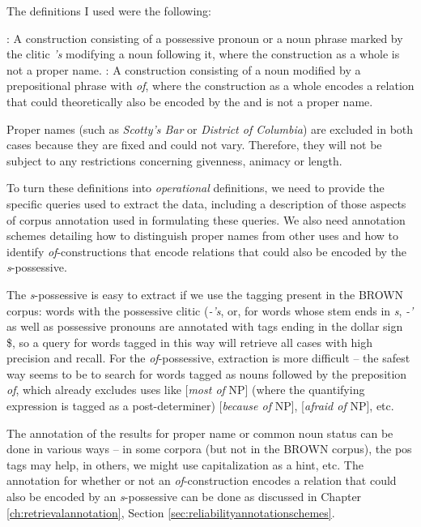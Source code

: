 The definitions I used were the following:

\begin{exe}
\ex
\begin{xlist} 
\label{ex:sgenofcdefinition}
\ex {}: A construction consisting of a possessive pronoun or a noun phrase marked by the clitic \textit{'s} modifying a noun following it, where the construction as a whole is not a proper name.
\ex {}: A construction consisting of a noun modified by a prepositional phrase with \textit{of}, where the construction as a whole encodes a relation that could theoretically also be encoded by the  and is not a proper name.
\end{xlist}
\end{exe}

Proper names (such as \textit{Scotty's Bar} or \textit{District of Columbia}) are excluded in both cases because they are fixed and could not vary. Therefore, they will not be subject to any restrictions concerning givenness, animacy or length.

To turn these definitions into \emph{operational} definitions, we need to provide the specific queries used to extract the data, including a description of those aspects of corpus annotation used in formulating these queries. We also need annotation schemes detailing how to distinguish proper names from other uses and how to identify \textit{of}-constructions that encode relations that could also be encoded by the \textit{s}-possessive.

The \textit{s}-possessive is easy to extract if we use the tagging present in the BROWN corpus: words with the possessive clitic (\textit{-'s}, or, for words whose stem ends in \textit{s}, \textit{-'} as well as possessive pronouns are annotated with tags ending in the dollar sign \$, so a query for words tagged in this way will retrieve all cases with high precision and recall. For the \textit{of}-possessive, extraction is more difficult -- the safest way seems to be to search for words tagged as nouns followed by the preposition \textit{of}, which already excludes uses like [\textit{most of} NP] (where the quantifying expression is tagged as a post-determiner) [\textit{because of} NP], [\textit{afraid of} NP], etc.

The annotation of the results for proper name or common noun status can be done in various ways -- in some corpora (but not in the BROWN corpus), the pos tags may help, in others, we might use capitalization as a hint, etc. The annotation for whether or not an \textit{of}-construction encodes a relation that could also be encoded by an \textit{s}-possessive can be done as discussed in Chapter \ref{ch:retrievalannotation}, Section \ref{sec:reliabilityannotationschemes}.

